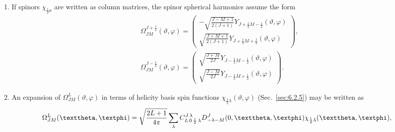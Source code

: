\begin{enumerate}[label=(\alph*)]
\begin{equation}
\end{equation}
A more detailed form of \eqref{eq:7:2:9} is
\begin{align}
{\left[\Omega_{J M}^{J+\frac{1}{2}}(\vartheta, \varphi)\right]_{\frac{1}{2}} } & =\sqrt{\frac{J+M+1}{2(J+1)}} Y_{J+\frac{1}{2} M+\frac{1}{2}}(\vartheta, \varphi), \notag\\
{\left[\Omega_{J M}^{J+\frac{1}{2}}(\vartheta, \varphi)\right]_{-\frac{1}{2}} } & =\sqrt{\frac{J-M+1}{2(J+1)}} Y_{J+\frac{1}{2} M-\frac{1}{2}}(\vartheta, \varphi), \label{eq:7:2:10}\\
{\left[\Omega_{J M}^{J-\frac{1}{2}}(\vartheta, \varphi)\right]_{\frac{1}{2}} } & =\sqrt{\frac{J-M}{2 J}} Y_{J-\frac{1}{2} M+\frac{1}{2}}(\vartheta, \varphi), \label{eq:7:2:11}\\
{\left[\Omega_{J M}^{J-\frac{1}{2}}(\vartheta, \varphi)\right]_{-\frac{1}{2}} } & =-\sqrt{\frac{J+M}{2 J}} Y_{J-\frac{1}{2} M-\frac{1}{2}}(\vartheta, \varphi). \notag
\end{align}
\item If spinors $\chi_{\frac{1}{2} \sigma}$ are written as column matrices, the spinor spherical harmonics assume the form
\begin{align}
& \Omega_{J M}^{J+\frac{1}{2}}(\vartheta, \varphi)=\begin{pmatrix}-\sqrt{\frac{J-M+1}{2(J+1)}} Y_{J+\frac{1}{2} M-\frac{1}{2}}(\vartheta, \varphi)\\ \sqrt{\frac{J+M+1}{2(J+1)}} Y_{J+\frac{1}{2} M+\frac{1}{2}}(\vartheta, \varphi)\end{pmatrix}, \label{eq:7:2:12}\\
& \Omega_{J M}^{J-\frac{1}{2}}(\vartheta, \varphi)=\begin{pmatrix}\sqrt{\frac{J+M}{2 J}} Y_{J-\frac{1}{2} M-\frac{1}{2}}(\vartheta, \varphi) \\ \sqrt{\frac{J-M}{2 J}} Y_{J-\frac{1}{2} M+\frac{1}{2}}(\vartheta, \varphi)\end{pmatrix}. \label{eq:7:2:13}
\end{align}
\item An expansion of $\Omega_{J M}^{L}(\vartheta, \varphi)$ in terms of helicity basis spin functions $\chi_{\frac{1}{2} \lambda}(\vartheta, \varphi)$ (Sec.~\ref{sec:6.2.5}) may be written as
\begin{equation}
\Omega_{J M}^{L}(\vartheta, \varphi)=\sqrt{\frac{2 L+1}{4 \pi}} \sum_{\lambda} \clebsch{L}{0}{\frac{1}{2}}{\lambda}{J}{\lambda} D_{-\lambda-M}^{J}(0, \vartheta, \varphi) \chi_{\frac{1}{2} \lambda}(\vartheta, \varphi), \label{eq:7:2:14}

\end{equation}
\end{enumerate}
